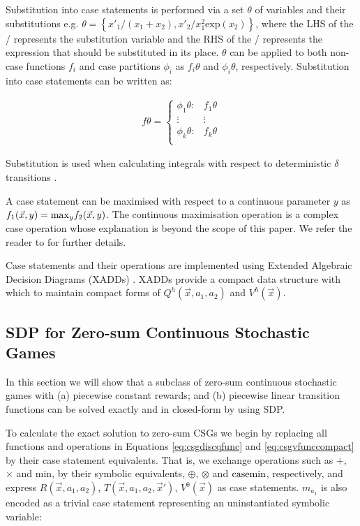 Substitution into case statements is performed via a set $\theta$ of variables and their
substitutions e.g. {\small $\theta = \left\{ x'_1/(x_1 + x_2), x'_2/x^2_{1} \text{exp}(x_2) \right\}$},
where the LHS of the / represents the substitution variable and the 
RHS of the / represents the expression that should be substituted in its place.
$\theta$ can be applied to both non-case functions $f_i$ and case 
partitions $\phi_i$ as $f_i\theta$ and $\phi_i\theta$, respectively.
Substitution into case statements can be written as:

{\small 
\abovedisplayskip=0pt
\belowdisplayskip=0pt
\begin{align*}
  f\theta = 
    \begin{cases}
      \phi_1\theta: & f_1\theta \\ 
      \vdots & \vdots\\ 
      \phi_k\theta: & f_k\theta \\ 
    \end{cases}
\end{align*}
}%

Substitution is used when calculating integrals with respect to  deterministic $\delta$
transitions \cite{Sanner_UAI_2011}.

A case statement can be maximised with respect to a continuous parameter $y$
as {\small $ f_1(\vec{x}, y) = \mathrm{max}_{y}f_2(\vec{x}, y) $}. The continuous maximisation
operation is a complex case operation whose explanation is beyond the scope of 
this paper. We refer the reader to \cite{Zamani_AAAI_2012} for further details.

Case statements and their operations are implemented using Extended 
Algebraic Decision Diagrams (XADDs) \cite{Sanner_UAI_2011}.
XADDs provide a compact data structure with which to maintain
compact forms of {\small $Q^{h}(\vec{x}, a_1, a_2)$} and {\small $V^{h}(\vec{x})$}. 

\subsection{SDP for Zero-sum Continuous Stochastic Games}

In this section we will show that a subclass of zero-sum continuous stochastic
games with (a) piecewise constant rewards; and (b) piecewise linear transition
functions can be solved exactly and in closed-form by using SDP.

To calculate the exact solution to zero-sum CSGs we begin by replacing all functions
and operations in Equations \eqref{eq:csgdiscqfunc} and \eqref{eq:csgvfunccompact}
by their case statement equivalents. That is, we exchange operations such as 
$+$, $\times$ and min, by their symbolic equivalents, $\oplus$, $\otimes$ and $\mathrm{casemin}$,
respectively, and express {\small $R(\vec{x}, a_1, a_2)$}, 
{\small $T(\vec{x}, a_1, a_2, \vec{x}')$}, {\small $V^0(\vec{x})$} as case statements. $m_{a_{1}}$
is also encoded as a trivial case statement representing an uninstantiated symbolic variable:


